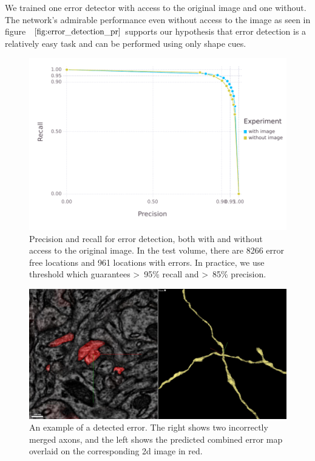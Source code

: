 \documentclass{article}
\begin{document}
We trained one error detector with access to the original image and one without. The network's admirable performance even without access to the image as seen in figure ~$\ref{fig:error_detection_pr}$ supports our hypothesis that error detection is a relatively easy task and can be performed using only shape cues.
\begin{figure}
\begin{center}
	\includegraphics[width=0.65\linewidth]{pr.pdf}
	\caption{Precision and recall for error detection, both with and without access to the original image. In the test volume, there are 8266 error free locations and 961 locations with errors. In practice, we use threshold which guarantees >~95\% recall and >~85\% precision.}
	\label{fig:error_detection_pr}
\end{center}
\end{figure}

\begin{figure}
\begin{center}
	\includegraphics[width=0.65\linewidth]{x_error.jpg}
	\caption{An example of a detected error. The right shows two incorrectly merged axons, and the left shows the predicted combined error map overlaid on the corresponding 2d image in red.}
	\label{fig:x_error}
\end{center}
\end{figure}
\end{document}
